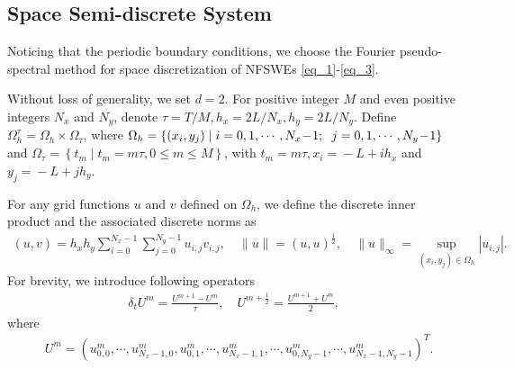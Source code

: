 \documentclass[preprint,compress,3p,10pt,fleqn]{elsarticle}
\numberwithin{equation}{section}
\begin{document}
	



\subsection{Space Semi-discrete System}
Noticing that the periodic boundary conditions, we choose the Fourier pseudo-spectral method for space discretization of NFSWEs \eqref{eq_1}-\eqref{eq_3}.

Without loss of generality, we set $d=2$.
For positive integer $M$ and even positive integers $N_{x}$ and $N_{y}$, denote $\tau={T}/{M}, h_{x}={2 L}/{N_{x}}, h_{y}={2 L}/{N_{y}}$. Define $\Omega_{h}^{\tau}=\Omega_{h} \times \Omega_{\tau}$, where $\Omega_{h}=\left\{\left(x_{i}, y_{j}\right) \mid i=0,1, \cdots, N_{x}\!-\!1;\right.\\ \left.j=0,1, \cdots, N_{y}\!-\!1\right\}$ and $\Omega_{\tau}=\left\{t_{m} \mid t_{m}=m \tau, 0 \leq m \leq M\right\}$, with $t_{m}=m \tau, x_{i}\!=\!-L+i h_{x}$ and $y_{j}\!=\!-L+j h_{y}$.

For any grid functions $u$ and $v$ defined on $\Omega_h$,
we define the discrete inner product and the associated discrete norms as
\begin{align}\label{eq_48}
(u, v)=h_{x} h_{y} \sum_{i=0}^{N_{x}-1} \sum_{j=0}^{N_{y}-1} u_{i, j} v_{i, j}, \quad\|u\|=(u, u)^{\frac{1}{2}}, \quad\|u\|_{\infty}=\sup _{\left(x_{i}, y_{j}\right) \in \Omega_{h}}\left|u_{i, j}\right|.
\end{align}
For brevity, we introduce following operators
\begin{align}\label{eq_49}
\delta_{t} U^{m}=\frac{U^{m+1}-U^{m}}{\tau}, \quad U^{m+\frac{1}{2}}=\frac{U^{m+1}+U^{m}}{2},
\end{align}
where
\begin{align}\label{eq_47}
&U^m=\left(u_{0,0}^m, \cdots, u_{N_{x}-1,0}^m, u_{0,1}^m, \cdots, u_{N_{x}-1,1}^m, \cdots, u_{0, N_{y}-1}^m, \cdots, u_{N_{x}-1, N_{y}-1}^m\right)^{T}. %
\end{align}
\end{document}
